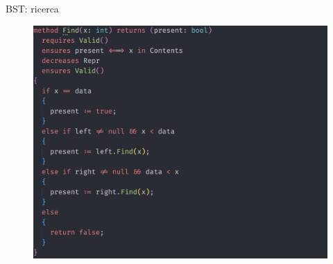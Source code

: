 \documentclass{beamer}
\begin{document}
\begin{frame}{BST: ricerca}
    \begin{figure}
        \includegraphics[scale=0.45]{./assets/images/screenshots/find.png}
    \end{figure}
\end{frame}
\end{document}
